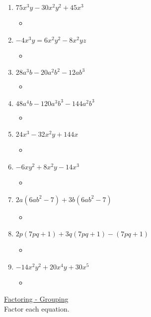 \documentclass{article}
\begin{document}
\begin{enumerate}
\begin{itemize}
  \item 
  \end{itemize}
\item $75x^{3}y - 30x^{2}y^{2} + 45x^{3}$
  \begin{itemize}
  \item 
  \end{itemize}
\item $-4x^{3}y = 6x^{2}y^{2} - 8x^{2}yz$
  \begin{itemize}
  \item 
  \end{itemize}
\item $28a^{3}b - 20a^{2}b^{2} - 12ab^{3}$
  \begin{itemize}
  \item 
  \end{itemize}
\item $48a^{4}b - 120a^{3}b^{3} - 144a^{2}b^{3}$
  \begin{itemize}
  \item 
  \end{itemize}
\item $24x^{3} - 32x^{2}y + 144x$
  \begin{itemize}
  \item 
  \end{itemize}
\item $-6xy^{2} + 8x^{2}y - 14x^{3}$
  \begin{itemize}
  \item 
  \end{itemize}
\item $2a(6ab^{2}-7) + 3b(6ab^{2}-7)$
  \begin{itemize}
  \item 
  \end{itemize}
\item $2p(7pq+1) + 3q(7pq+1) - (7pq+1)$
  \begin{itemize}
  \item 
  \end{itemize}
\item $-14x^{2}y^{2} + 20x^{4}y + 30x^{5}$
  \begin{itemize}
  \item 
  \end{itemize}
\end{enumerate}
\underline{Factoring - Grouping} \\
Factor each equation. \\
\end{document}
